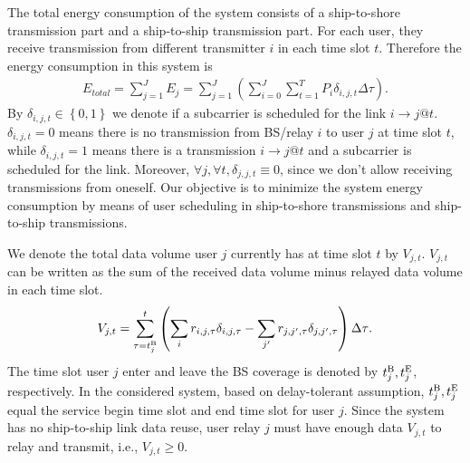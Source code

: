 \documentclass[conference]{IEEEtran}
\begin{document}
 The total energy consumption of the system consists of a ship-to-shore transmission part and a ship-to-ship transmission part. For each user, they receive transmission from different transmitter $i$ in each time slot $t$. Therefore the energy consumption in this system is
 \begin{align}
  {{E_{total}} = \sum\limits_{j = 1}^J {{E_j}} = \sum\limits_{j = 1}^J {\left( {\sum\limits_{i=0}^{J}{\sum\limits_{t = 1}^T {{P_{i}}\delta _{i,j,t}} } \Delta \tau  }\right)}}. 
  \end{align}
 By $\delta _{i,j,t} \in \left\{ {0,1} \right\}$ we denote if a subcarrier is scheduled for the link $i \to j @ t$. $ {{\delta _{i,j,t}}} = 0$ means there is no transmission from BS/relay $i$ to user $j$ at time slot $t$, while $ {{\delta _{i,j,t}}} = 1$ means there is a transmission $i \to j @ t$ and a subcarrier is scheduled for the link. Moreover, $\forall j,\forall t,{\delta _{j,j,t}} \equiv 0$, since we don't allow receiving transmissions from oneself. 
 Our objective is to minimize the system energy consumption by means of user scheduling in ship-to-shore transmissions and ship-to-ship transmissions. 
 
 We denote the total data volume user $j$ currently has at time slot $t$ by ${V_{j,t}}$. ${V_{j,t}}$ can be written as the sum of the received data volume minus relayed data volume in each time slot. 
 \begin{align}
  {V_{j,t}} = \sum\limits_{\tau = t_j^{{\rm{B}}}}^t {\left( {\sum\limits_i {{r_{i,j,\tau }\delta _{i,j,\tau}}} - \sum\limits_{j'} {{r_{j,j',\tau }\delta _{j,j',\tau}}} } \right) \Delta \tau } .
 \end{align}
 The time slot user $j$ enter and leave the BS coverage is denoted by $t_j^{{\rm{B}}},t_j^{{\rm{E}}}$, respectively. In the considered system, based on delay-tolerant assumption, $t_j^{{\rm{B}}},t_j^{{\rm{E}}}$ equal the service begin time slot and end time slot for user $j$. 
 Since the system has no ship-to-ship link data reuse, user relay $j$ must have enough data ${V_{j,t}}$ to relay and transmit, i.e., ${V_{j,t} \ge 0}$. 
\end{document}
